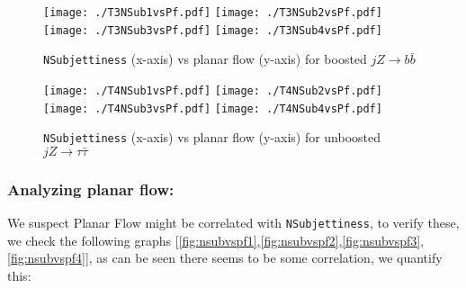 \begin{figure}[H]
    \begin{center}
        \texttt{[image: ./T3NSub1vsPf.pdf]}
        \texttt{[image: ./T3NSub2vsPf.pdf]}\\
        \texttt{[image: ./T3NSub3vsPf.pdf]}
        \texttt{[image: ./T3NSub4vsPf.pdf]}\\
        \caption{ {\tt NSubjettiness} (x-axis) vs planar flow (y-axis) for boosted $jZ\rightarrow b \bar{b}$ }
        \label{fig:nsubvspf3}
    \end{center}
\end{figure}

\begin{figure}[H]
    \begin{center}
        \texttt{[image: ./T4NSub1vsPf.pdf]}
        \texttt{[image: ./T4NSub2vsPf.pdf]}\\
        \texttt{[image: ./T4NSub3vsPf.pdf]}
        \texttt{[image: ./T4NSub4vsPf.pdf]}\\
        \caption{ {\tt NSubjettiness} (x-axis) vs planar flow (y-axis) for unboosted $jZ\rightarrow \tau \bar{\tau}$ }
        \label{fig:nsubvspf4}
    \end{center}
\end{figure}

{\newpage}

\subsubsection{Analyzing planar flow:}

We suspect Planar Flow might be correlated with {\tt NSubjettiness}, to verify these, we check the following graphs [\autoref{fig:nsubvspf1},\autoref{fig:nsubvspf2},\autoref{fig:nsubvspf3},\autoref{fig:nsubvspf4}], as can be seen there seems to be some correlation, we quantify this:


